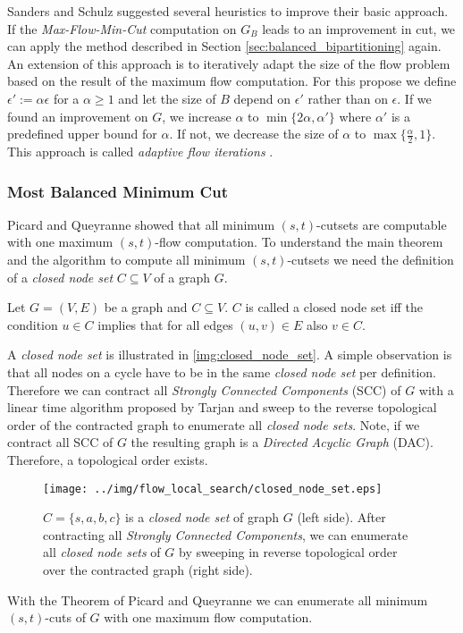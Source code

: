 Sanders and Schulz \cite{sanders2011engineering} suggested several heuristics to improve
their basic approach. If the \emph{Max-Flow-Min-Cut} computation on $G_B$ leads to an
improvement in cut, we can apply the method described in Section 
\ref{sec:balanced_bipartitioning} again. An extension of this approach is to iteratively adapt the
size of the flow problem based on the result of the maximum flow computation. For this propose
we define $\epsilon' := \alpha\epsilon$ for a $\alpha \ge 1$ and let the size of $B$ depend
on $\epsilon'$ rather than on $\epsilon$. If we found an improvement on $G$, we
increase $\alpha$ to $\min\{2\alpha, \alpha'\}$ where $\alpha'$ is a predefined upper bound
for $\alpha$. If not, we decrease the size of $\alpha$ to 
$\max\{\frac{\alpha}{2},1\}$. This approach is called
\emph{adaptive flow iterations} \cite{sanders2011engineering}.

\subsubsection{Most Balanced Minimum Cut}
\label{sec:related_mbmc}

Picard and Queyranne \cite{picard1980structure} showed that all minimum $(s,t)$-cutsets 
are computable with one maximum $(s,t)$-flow computation.
To understand the main theorem and the algorithm to compute all minimum $(s,t)$-cutsets we
need the definition of a \emph{closed node set} $C \subseteq V$ of a graph $G$.

\begin{definition}
Let $G = (V,E)$ be a graph and $C \subseteq V$. $C$ is called a closed node set iff the 
condition $u \in C$ implies that for all edges $(u,v) \in E$ also $v \in C$.
\end{definition}

A \emph{closed node set} is illustrated in \autoref{img:closed_node_set}. A simple observation
is that all nodes on a cycle have to be in the same \emph{closed node set} per definition. Therefore
we can contract all \emph{Strongly Connected Components} (SCC) of $G$ with a linear time algorithm
proposed by Tarjan \cite{tarjan1972depth} and sweep to the reverse
topological order of the contracted graph to enumerate all \emph{closed node sets}. Note, if
we contract all SCC of $G$ the resulting graph is a \emph{Directed Acyclic Graph} (DAC). Therefore, 
a topological order exists.
\begin{figure}
\centering
\texttt{[image: ../img/flow\_local\_search/closed\_node\_set.eps]}
\caption{$C = \{s,a,b,c\}$ is a \emph{closed node set} of graph $G$ (left side).
         After contracting all \emph{Strongly Connected Components}, we can enumerate all
         \emph{closed node sets} of $G$ by sweeping in reverse topological order over the
         contracted graph (right side).}
\label{img:closed_node_set}
\end{figure}
With the Theorem of Picard and Queyranne \cite{picard1980structure} we can enumerate
all minimum $(s,t)$-cuts of $G$ with one maximum flow computation.

